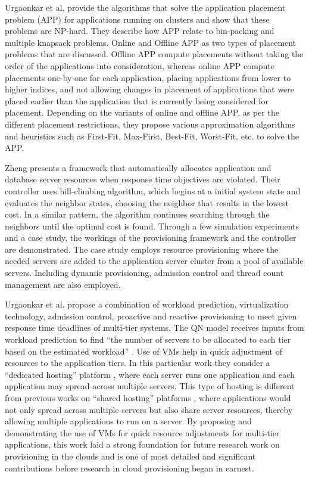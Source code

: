 \documentclass[10pt,journal,cspaper,compsoc]{IEEEtran}
\begin{document}
Urgaonkar et al. \cite{2007_Urgaonkar_APP} provide the algorithms that solve the application placement problem (APP) for applications running on clusters and show that these problems are NP-hard. They describe how APP relate to bin-packing and multiple knapsack problems. Online and Offline APP as two types of placement problems that are discussed. Offline APP compute placements without taking the order of the applications into consideration, whereas online APP compute placements one-by-one for each application, placing applications from lower to higher indices, and not allowing changes in placement of applications that were placed earlier than the application that is currently being considered for placement. Depending on the variants of online and offline APP, as per the different placement restrictions, they propose various approximation algorithms and heuristics such as First-Fit, Max-First, Best-Fit, Worst-Fit, etc. to solve the APP.

Zheng \cite{zheng2007model9} presents a framework that automatically allocates application and database server resources when response time objectives are violated. Their controller uses hill-climbing algorithm, which begins at a initial system state and evaluates the neighbor states, choosing the neighbor that results in the lowest cost. In a similar pattern, the algorithm continues searching through the neighbors until the optimal cost is found. Through a few simulation experiments and a case study, the workings of the provisioning framework and the controller are demonstrated. The case study employs resource provisioning where the needed servers are added to the application server cluster from a pool of available servers. Including dynamic provisioning, admission control and thread count management are also employed.

Urgaonkar et al. \cite{urgaonkar2008agile10} propose a combination of workload prediction, virtualization technology, admission control, proactive and reactive provisioning to meet given response time deadlines of multi-tier systems. The QN model receives inputs from workload prediction to find ``the number of servers to be allocated to each tier based on the estimated workload'' \cite[p~1:5]{urgaonkar2008agile10}. Use of VMs help in quick adjustment of resources to the application tiers. In this particular work they consider a ``dedicated hosting'' platform \cite{urgaonkar2008agile10}, where each server runs one application and each application may spread across multiple servers. This type of hosting is different from previous works on ``shared hosting'' platforms \cite{2009_Urgaonkar_ResourceOverbookingShared, 2004_Urgaonkar_SharcShared}, where applications would not only spread across multiple servers but also share server resources, thereby allowing multiple applications to run on a server. By proposing and demonstrating the use of VMs for quick resource adjustments for multi-tier applications, this work \cite{urgaonkar2008agile10} laid a strong foundation for future research work on provisioning in the clouds and is one of most detailed and significant contributions before research in cloud provisioning began in earnest. 
\end{document}
